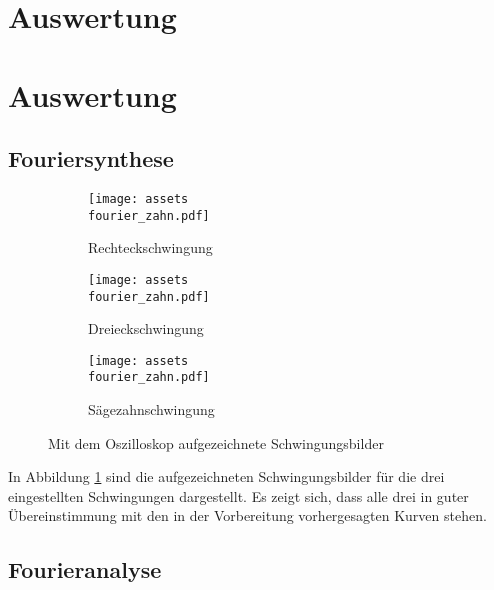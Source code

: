 \section{Auswertung}
\label{sec:Auswertung}

\section{Auswertung}
\subsection{Fouriersynthese}
\begin{figure}
\begin{subfigure}{0.5\textwidth}
    \centering
    \texttt{[image: assets\\fourier\_zahn.pdf]}
    \caption{Rechteckschwingung}
\end{subfigure}
\begin{subfigure}{0.5\textwidth}
    \centering
    \texttt{[image: assets\\fourier\_zahn.pdf]}
    \caption{Dreieckschwingung}
\end{subfigure}
\begin{subfigure}{0.5\textwidth}
    \centering
    \texttt{[image: assets\\fourier\_zahn.pdf]}
    \caption{Sägezahnschwingung}
\end{subfigure}
\caption{Mit dem Oszilloskop aufgezeichnete Schwingungsbilder}
\label{fig:oszi}
\end{figure}

In Abbildung \ref{fig:oszi} sind die aufgezeichneten Schwingungsbilder für die drei eingestellten Schwingungen dargestellt. Es zeigt sich, dass alle drei in guter Übereinstimmung mit den in der Vorbereitung vorhergesagten Kurven stehen.

\subsection{Fourieranalyse}
